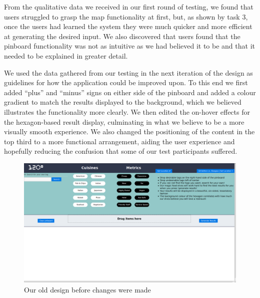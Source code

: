 \documentclass[10pt,a4paper]{article}
\begin{document}
From the qualitative data we received in our first round of testing, we found that users struggled to grasp the map functionality at first, but, as shown by task 3, once the users had learned the system they were much quicker and more efficient at generating the desired input. We also discovered that users found that the pinboard functionality was not as intuitive as we had believed it to be and that it needed to be explained in greater detail.

We used the data gathered from our testing in the next iteration of the design as guidelines for how the application could be improved upon. To this end we first added “plus” and “minus” signs on either side of the pinboard and added a colour gradient to match the results displayed to the background, which we believed illustrates the functionality more clearly. We then edited the on-hover effects for the hexagon-based result display, culminating in what we believe to be a more visually smooth experience. We also changed the positioning of the content in the top third to a more functional arrangement, aiding the user experience and hopefully reducing the confusion that some of our test participants suffered.

\begin{figure}[H]
	\begin{center}
		\includegraphics[scale=0.2]{oldScreenshot.png}
		\caption{Our old design before changes were made}
		\label{figure:old-design}
	\end{center}
\end{figure}
\end{document}
